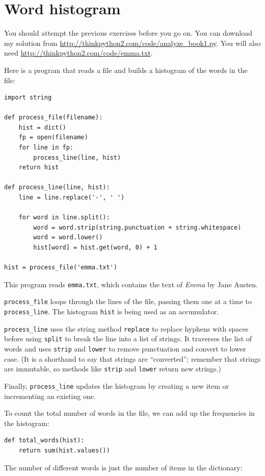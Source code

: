 \documentclass[10pt]{book}
\begin{document}
\section{Word histogram}

You should attempt the previous exercises before you go on.
You can download my solution from
 \url{http://thinkpython2.com/code/analyze_book1.py}.  You will
also need \url{http://thinkpython2.com/code/emma.txt}.

Here is a program that reads a file and builds a histogram of the
words in the file:

\begin{verbatim}
import string

def process_file(filename):
    hist = dict()
    fp = open(filename)
    for line in fp:
        process_line(line, hist)
    return hist

def process_line(line, hist):
    line = line.replace('-', ' ')

    for word in line.split():
        word = word.strip(string.punctuation + string.whitespace)
        word = word.lower()
        hist[word] = hist.get(word, 0) + 1

hist = process_file('emma.txt')
\end{verbatim}
%
This program reads {\tt emma.txt}, which contains the text of {\em
  Emma} by Jane Austen.

\verb"process_file" loops through the lines of the file,
passing them one at a time to \verb"process_line".  The histogram
{\tt hist} is being used as an accumulator.

\verb"process_line" uses the string method {\tt replace} to replace
hyphens with spaces before using {\tt split} to break the line into a
list of strings.  It traverses the list of words and uses {\tt strip}
and {\tt lower} to remove punctuation and convert to lower case.  (It
is a shorthand to say that strings are ``converted''; remember that
strings are immutable, so methods like {\tt strip} and {\tt lower}
return new strings.)

Finally, \verb"process_line" updates the histogram by creating a new
item or incrementing an existing one.

To count the total number of words in the file, we can add up
the frequencies in the histogram:

\begin{verbatim}
def total_words(hist):
    return sum(hist.values())
\end{verbatim}
%
The number of different words is just the number of items in
the dictionary:
\end{document}
